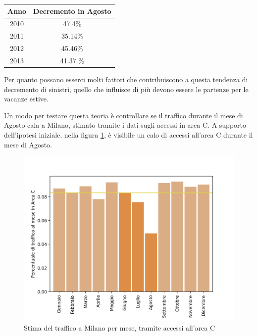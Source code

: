 \documentclass[a4paper]{report}
\begin{document}
\begin{center}
    \def\arraystretch{1.5}%
    \begin{tabular}{ |c|c| } 
        \hline
        Anno & Decremento in Agosto \\ 
        \hline
        2010 & 47.4\%  \\ 
        \rowcolor{TableGray}
        2011 & 35.14\% \\
        2012 & 45.46\% \\
        \rowcolor{TableGray}
        2013 & 41.37 \% \\
        \hline
    \end{tabular}
\end{center}

Per quanto possano esserci molti fattori che contribuiscono a questa tendenza di decremento di sinistri, 
quello che influisce di più devono essere le partenze per le vacanze estive.

Un modo per testare questa teoria è controllare se il traffico durante il mese di Agosto cala a 
Milano, stimato tramite i dati sugli accessi in area C. 
A supporto dell'ipotesi iniziale, nella figura \ref{fig:stima-traffico-mensile}, 
è visibile un calo di accessi all'area C durante il mese di Agosto.

\begin{figure}
    \includegraphics[width=\linewidth]{../src/area_c/stima_traffico_mese.png}
    \caption{Stima del traffico a Milano per mese, tramite accessi all'area C}
    \label{fig:stima-traffico-mensile}
\end{figure}
\end{document}
